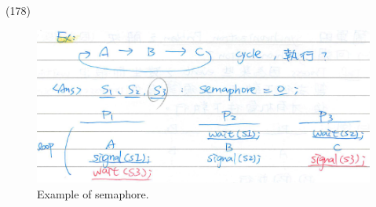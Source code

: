 \begin{theorem}{(178)}
\begin{itemize}
        \begin{figure}[H]
            \centering
            \includegraphics[scale=0.75]{img/ex_semaphore.png}
            \caption{Example of semaphore.}
            \label{img:ex_semaphore}
        \end{figure}
    \end{itemize}
\end{theorem}


